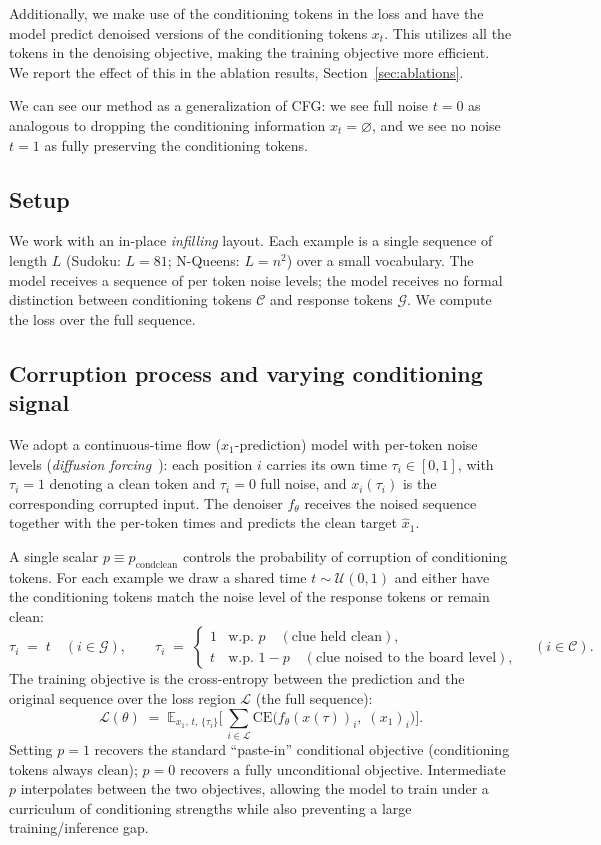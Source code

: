 \documentclass{article}
\begin{document}
Additionally, we make use of the conditioning tokens in the loss and have the model 
predict denoised versions of the conditioning tokens $x_t$. This utilizes all the tokens in the denoising
objective, making the training objective more efficient. We report the effect of this in
the ablation results, Section~\ref{sec:ablations}.

We can see our method as a generalization of CFG: we see full noise $t=0$ as analogous to
dropping the conditioning information $x_t = \varnothing$, and we see no noise $t=1$ as
fully preserving the conditioning tokens.


\subsection{Setup}
\label{sec:method-setup}
We work with an in-place \emph{infilling} layout. Each example is a single sequence of length $L$
(Sudoku: $L=81$; N-Queens: $L=n^2$) over a small vocabulary. The model receives a sequence
of per token noise levels; the model receives no formal distinction
between conditioning tokens $\mathcal{C}$ and response tokens $\mathcal{G}$. We compute   
the loss over the full sequence.

\subsection{Corruption process and varying conditioning signal}
\label{sec:method-objective}
We adopt a continuous-time flow ($x_1$-prediction) model with per-token noise levels
(\emph{diffusion forcing}~\citep{diffusion_forcing}): each position $i$ carries its own time
$\tau_i \in [0,1]$, with $\tau_i = 1$ denoting a clean token and $\tau_i = 0$ full noise, and
$x_i(\tau_i)$ is the corresponding corrupted input. The denoiser $f_\theta$ receives the noised
sequence together with the per-token times and predicts the clean target $\hat{x}_1$.

A single scalar $p \equiv p_\text{condclean}$ controls the probability of corruption of conditioning tokens.
For each example we draw a shared time $t \sim \mathcal{U}(0,1)$ and either have the 
conditioning tokens match the noise level of the response tokens or remain clean: 
\[
\tau_i \;=\; t \quad (i \in \mathcal{G}), \qquad
\tau_i \;=\;
\begin{cases}
1 & \text{w.p. } p \quad(\text{clue held clean}),\\
t & \text{w.p. } 1-p \quad(\text{clue noised to the board level}),
\end{cases}
\quad (i \in \mathcal{C}).
\]
The training objective is the cross-entropy between the prediction and the original sequence over the
loss region $\mathcal{L}$ (the full sequence):
\[
\mathcal{L}(\theta) \;=\; \mathbb{E}_{x_1,\, t,\, \{\tau_i\}}
\Big[\, \textstyle\sum_{i \in \mathcal{L}} \mathrm{CE}\big(f_\theta(x(\tau))_i,\; (x_1)_i\big) \Big].
\]
Setting $p=1$ recovers the standard ``paste-in'' conditional objective (conditioning tokens always clean);
$p=0$ recovers a fully unconditional objective.
Intermediate $p$ interpolates between the two objectives, allowing the model to train under 
a curriculum of conditioning strengths while also preventing a large training/inference gap. 
\end{document}
